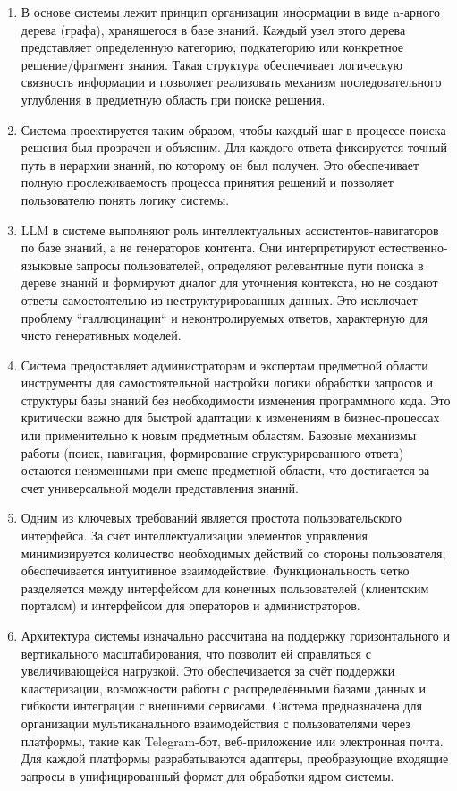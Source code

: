 \begin{enumerate}[label=\arabic*.]
    \item В основе системы лежит принцип организации информации в виде n-арного дерева (графа), хранящегося в базе знаний. Каждый узел этого дерева представляет определенную категорию, подкатегорию или конкретное решение/фрагмент знания. Такая структура обеспечивает логическую связность информации и позволяет реализовать механизм последовательного углубления в предметную область при поиске решения.
    \item Система проектируется таким образом, чтобы каждый шаг в процессе поиска решения был прозрачен и объясним. Для каждого ответа фиксируется точный путь в иерархии знаний, по которому он был получен. Это обеспечивает полную прослеживаемость процесса принятия решений и позволяет пользователю понять логику системы.
    \item LLM в системе выполняют роль интеллектуальных ассистентов-навигаторов по базе знаний, а не генераторов контента. Они интерпретируют естественно-языковые запросы пользователей, определяют релевантные пути поиска в дереве знаний и формируют диалог для уточнения контекста, но не создают ответы самостоятельно из неструктурированных данных. Это исключает проблему ``галлюцинации`` и неконтролируемых ответов, характерную для чисто генеративных моделей.
    \item Система предоставляет администраторам и экспертам предметной области инструменты для самостоятельной настройки логики обработки запросов и структуры базы знаний без необходимости изменения программного кода. Это критически важно для быстрой адаптации к изменениям в бизнес-процессах или применительно к новым предметным областям. Базовые механизмы работы (поиск, навигация, формирование структурированного ответа) остаются неизменными при смене предметной области, что достигается за счет универсальной модели представления знаний.
    \item Одним из ключевых требований является простота пользовательского интерфейса. За счёт интеллектуализации элементов управления минимизируется количество необходимых действий со стороны пользователя, обеспечивается интуитивное взаимодействие. Функциональность четко разделяется между интерфейсом для конечных пользователей (клиентским порталом) и интерфейсом для операторов и администраторов.
    \item Архитектура системы изначально рассчитана на поддержку горизонтального и вертикального масштабирования, что позволит ей справляться с увеличивающейся нагрузкой. Это обеспечивается за счёт поддержки кластеризации, возможности работы с распределёнными базами данных и гибкости интеграции с внешними сервисами. Система предназначена для организации мультиканального взаимодействия с пользователями через платформы, такие как Telegram-бот, веб-приложение или электронная почта. Для каждой платформы разрабатываются адаптеры, преобразующие входящие запросы в унифицированный формат для обработки ядром системы.
\end{enumerate}

